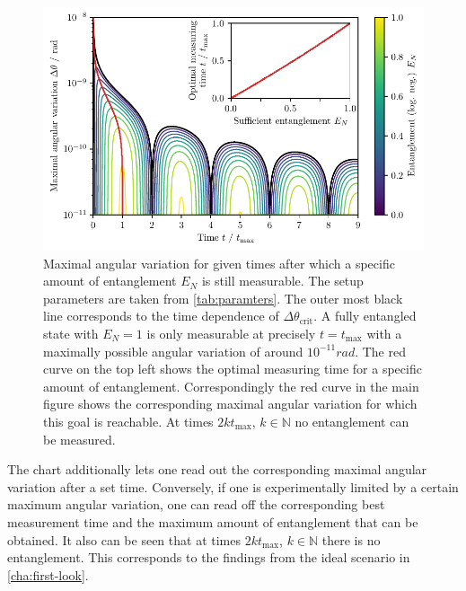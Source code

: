 \begin{figure}[!htbp]
  \centering
  \includegraphics[width=\textwidth]{./../figures/theta-variance/time-delta-theta-crit-EN.pdf}
  \caption{Maximal angular variation for given times after which a specific amount of entanglement $E_N$ is still measurable. The setup parameters are taken from \cref{tab:paramters}. The outer most black line corresponds to the time dependence of $\Delta \theta_\mathrm{crit}$. A fully entangled state with $E_N=1$ is only measurable at precisely $t=t_\mathrm{max}$ with a maximally possible angular variation of around $10^{-11}\si{rad}$. The red curve on the top left shows the optimal measuring time for a specific amount of entanglement. Correspondingly the red curve in the main figure shows the corresponding maximal angular variation for which this goal is reachable. At times $2k t_\mathrm{max},\,k\in\mathbb{N}$ no entanglement can be measured.}
  \label{fig:4:time-delta-theta}
\end{figure}
The chart additionally lets one read out the corresponding maximal angular variation after a set time.
Conversely, if one is experimentally limited by a certain maximum angular variation, one can read off the corresponding best measurement time and the maximum amount of entanglement that can be obtained.
It also can be seen that at times $2k t_\mathrm{max}$, $k\in\mathbb{N}$ there is no entanglement. This corresponds to the findings from the ideal scenario in \cref{cha:first-look}. 